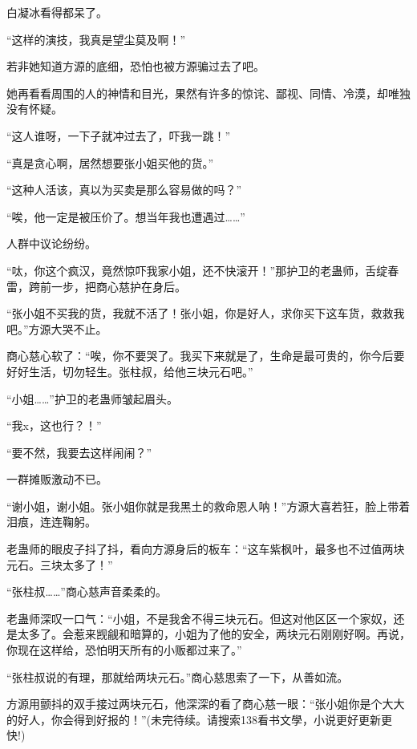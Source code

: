 \begin{this_body}
白凝冰看得都呆了。

“这样的演技，我真是望尘莫及啊！”

若非她知道方源的底细，恐怕也被方源骗过去了吧。

她再看看周围的人的神情和目光，果然有许多的惊诧、鄙视、同情、冷漠，却唯独没有怀疑。

“这人谁呀，一下子就冲过去了，吓我一跳！”

“真是贪心啊，居然想要张小姐买他的货。”

“这种人活该，真以为买卖是那么容易做的吗？”

“唉，他一定是被压价了。想当年我也遭遇过……”

人群中议论纷纷。

“呔，你这个疯汉，竟然惊吓我家小姐，还不快滚开！”那护卫的老蛊师，舌绽春雷，跨前一步，把商心慈护在身后。

“张小姐不买我的货，我就不活了！张小姐，你是好人，求你买下这车货，救救我吧。”方源大哭不止。

商心慈心软了：“唉，你不要哭了。我买下来就是了，生命是最可贵的，你今后要好好生活，切勿轻生。张柱叔，给他三块元石吧。”

“小姐……”护卫的老蛊师皱起眉头。

“我x，这也行？！”

“要不然，我要去这样闹闹？”

一群摊贩激动不已。

“谢小姐，谢小姐。张小姐你就是我黑土的救命恩人呐！”方源大喜若狂，脸上带着泪痕，连连鞠躬。

老蛊师的眼皮子抖了抖，看向方源身后的板车：“这车紫枫叶，最多也不过值两块元石。三块太多了！”

“张柱叔……”商心慈声音柔柔的。

老蛊师深叹一口气：“小姐，不是我舍不得三块元石。但这对他区区一个家奴，还是太多了。会惹来觊觎和暗算的，小姐为了他的安全，两块元石刚刚好啊。再说，你现在这样给，恐怕明天所有的小贩都过来了。”

“张柱叔说的有理，那就给两块元石。”商心慈思索了一下，从善如流。

方源用颤抖的双手接过两块元石，他深深的看了商心慈一眼：“张小姐你是个大大的好人，你会得到好报的！”(未完待续。请搜索138看书文學，小说更好更新更快!)

\end{this_body}

